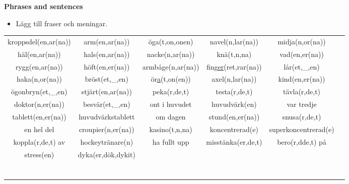 
\begin{flushleft}
    \textbf{Phrases and sentences}
    \begin{itemize}
        \item Lägg till fraser och meningar.
    \end{itemize}
\end{flushleft}

\begin{center}
    \begin{adjustwidth}{-2.4cm}{}
        \begin{tabular}{|c c c c c c|}
            \hline
            kroppsdel(en,ar(na)) & arm(en,ar(na)) & öga(t,on,onen) & navel(n,lar(na)) & midja(n,or(na)) &  \\
            häl(en,ar(na)) & hals(en,ar(na)) & nacke(n,ar(na)) & knä(t,n,na) & vad(en,er(na)) &  \\
            rygg(en,ar(na)) & höft(en,er(na)) & armbåge(n,ar(na)) & fing\underline{er}(ret,rar(na)) & lår(et,\_,en) &  \\
            haka(n,or(na)) & bröst(et,\_,en) & ör\underline{a}(t,on(en)) & axel(n,lar(na)) & kind(en,er(na)) &  \\
            ögonbryn(et,\_,en) & stjärt(en,ar(na)) & peka(r,de,t) & testa(r,de,t) & tävla(r,de,t) &  \\
            doktor(n,er(na)) & besvär(et,\_,en) & ont i huvudet & huvudvärk(en) & var tredje &  \\
            tablett(en,er(na)) & huvudvärkstablett & om dagen & stund(en,er(na)) & snusa(r,de,t) &  \\
            en hel del & croupier(n,er(na)) & kasino(t,n,na) & koncentrerad(e) & superkoncentrerad(e) &  \\
            koppla(r,de,t) av & hockeytränare(n) & ha fullt upp & misstänka(er,de,t) & bero(r,dde,t) på &  \\
            stress(en) & dyka(er,dök,dykit) &  &  &  &  \\
             &  &  &  &  &  \\
             &  &  &  &  &  \\
             &  &  &  &  &  \\
             &  &  &  &  &  \\
             &  &  &  &  &  \\
             &  &  &  &  &  \\
             &  &  &  &  &  \\

\end{tabular}
\end{adjustwidth}
\end{center}
